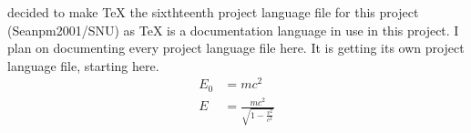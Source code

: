\documentclass{article} %
\title{\ProjectLanguageFileSixteen} %
\begin{document}
  \maketitle
  \I decided to make TeX the sixthteenth project language file for this project (Seanpm2001/SNU) as TeX is a documentation language in use in this project. I plan on documenting every project language file here. It is getting its own project language file, starting here.
  \begin{align}
    E_0 &= mc^2 \\
    E &= \frac{mc^2}{\sqrt{1-\frac{v^2}{c^2}}}
  \end{align} 
\end{document}
